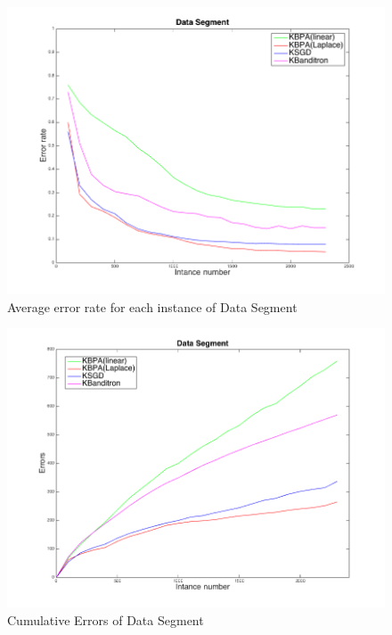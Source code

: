 \documentclass[preprint,12pt,authoryear]{elsarticle}
\begin{document}
\begin{figure}[h!]
	\centerline{
		\includegraphics[scale = 0.4]{figs/Segment_kernel_M.png}}
	\caption{Average error rate for each instance of Data Segment}
	\label{pic:SKM}
\end{figure}

\begin{figure}[h!]
	\centerline{
		\includegraphics[scale = 0.4]{figs/Segment_kernel_CM.png}}
	\caption{Cumulative Errors of Data Segment}
	\label{pic:SKCM}
\end{figure}

\end{document}
